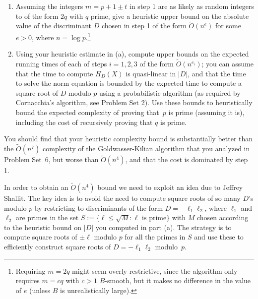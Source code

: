 \documentclass[11pt]{article}
\newcommand{\softO}{\widetilde{O}}
\begin{document}
\begin{enumerate}[{\bf (a)}]
\item Assuming the integers $m=p+1\pm t$ in step 1 are as likely as random integers to of the form $2q$ with $q$ prime, give a heuristic upper bound on the absolute value of the discriminant $D$ chosen in step 1 of the form $\softO(n^e)$ for some $e>0$, where $n=\log p$.\footnote{Requiring $m=2q$ might seem overly restrictive, since the algorithm only requires $m=cq$ with $c>1$ $B$-smooth, but it makes no difference in the value of $e$ (unless $B$ is unrealistically large).}
\item Using your heuristic estimate in (a), compute upper bounds on the expected running times of each of steps $i=1,2,3$ of the form $\softO(n^{e_i})$; you can assume that the time to compute $H_D(X)$ is quasi-linear in $|D|$, and that the time to solve the norm equation is bounded by the expected time to compute a square root of $D$ modulo $p$ using a probabilistic algorithm (as required by Cornacchia's algorithm, see Problem Set 2).
Use these bounds to heuristically bound the expected complexity of proving that~$p$ is prime (assuming it is), including the cost of recursively proving that $q$ is prime.
\end{enumerate}
You should find that your heuristic complexity bound is substantially better than the $\softO(n^7)$ complexity of the Goldwasser-Kilian algorithm that you analyzed in Problem Set~6, but worse than $\softO(n^4)$, and that the cost is dominated by step 1.
\bigskip

In order to obtain an $\softO(n^4)$ bound we need to exploit an idea due to Jeffrey Shallit.
The key idea is to avoid the need to compute square roots of so many $D$'s modulo $p$ by restricting to discriminants of the form $D=-\ell_1\ell_2$, where $\ell_1$ and $\ell_2$ are primes in the set $S:=\{\ell\le \sqrt{M}:\ell \text{ is prime}\}$ with $M$ chosen according to the heuristic bound on $|D|$ you computed in part (a).  The strategy is to compute square roots of $\pm \ell$ modulo $p$ for all the primes in $S$ and use these to efficiently construct square roots of $D=-\ell_1\ell_2$ modulo~$p$.
\end{document}
